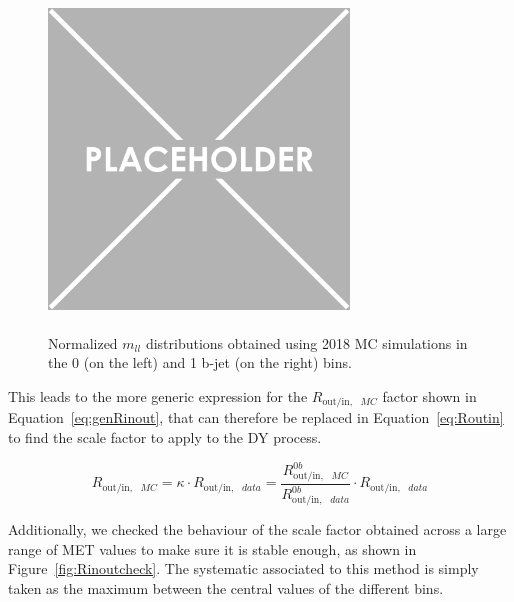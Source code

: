 \documentclass[a4paper, 10pt, openright]{report}
\begin{document}
\begin{figure}[htbp]
\begin{center}
\includegraphics[width=8cm, height=9cm]{figs/placeholder.png}
\caption{Normalized $m_{ll}$ distributions obtained using 2018 \ac{MC} simulations in the 0 (on the left) and 1 b-jet (on the right) bins.}
\label{fig:Rinoutver}
\end{center}
\end{figure}

This leads to the more generic expression for the $R_{\text{out/in},\text{ } MC}$ factor shown in Equation~\ref{eq:genRinout}, that can therefore be replaced in Equation~\ref{eq:Routin} to find the scale factor to apply to the \ac{DY} process.	

\begin{equation}
\label{eq:genRinout}
 R_{\text{out/in},\text{ } MC} = \kappa \cdot R_{\text{out/in},\text{ } data} = \frac{R_{\text{out/in},\text{ } MC}^{0b}}{R_{\text{out/in},\text{ } data}^{0b}} \cdot R_{\text{out/in},\text{ } data}
\end{equation}

Additionally, we checked the behaviour of the scale factor obtained across a large range of \ac{MET} values to make sure it is stable enough, as shown in Figure~\ref{fig:Rinoutcheck}. The systematic associated to this method is simply taken as the maximum between the central values of the different bins.
\end{document}
